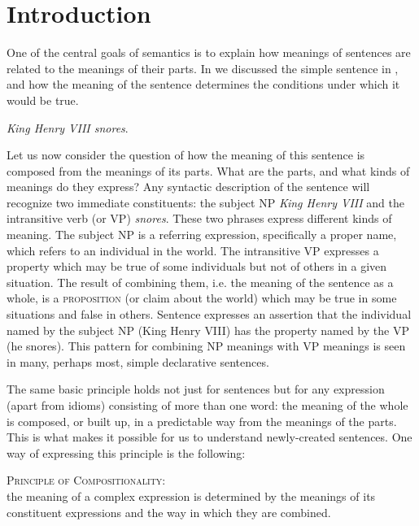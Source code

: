 \section{Introduction}\label{sec:} %

One of the central goals of semantics is to explain how meanings of sentences are related to the meanings of their parts. In  we discussed the simple sentence in , and how the meaning of the sentence determines the conditions under which it would be true.


\ea
\textit{King Henry VIII snores}.
\z


Let us now consider the question of how the meaning of this sentence is composed from the meanings of its parts. What are the parts, and what kinds of meanings do they express? Any syntactic description of the sentence will recognize two immediate constituents: the subject NP \textit{King Henry VIII} and the intransitive verb (or VP) \textit{snores}. These two phrases express different kinds of meaning. The subject NP is a referring expression, specifically a proper name, which refers to an individual in the world. The intransitive VP expresses a property which may be true of some individuals but not of others in a given situation. The result of combining them, i.e. the meaning of the sentence as a whole, is a \textsc{proposition} (or claim about the world) which may be true in some situations and false in others. Sentence  expresses an assertion that the individual named by the subject NP (King Henry VIII) has the property named by the VP (he snores). This pattern for combining NP meanings with VP meanings is seen in many, perhaps most, simple declarative sentences.



The same basic principle holds not just for sentences but for any expression (apart from idioms) consisting of more than one word: the meaning of the whole is composed, or built up, in a predictable way from the meanings of the parts. This is what makes it possible for us to understand newly-created sentences. One way of expressing this principle is the following:


\begin{stylepoints}
\textsc{Principle of Compositionality:\\
}the meaning of a complex expression is determined by the meanings of its constituent expressions and the way in which they are combined.
\end{stylepoints}


